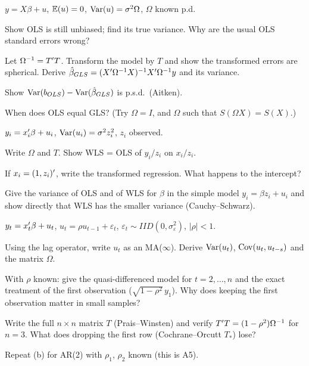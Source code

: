 \documentclass[11pt]{article}
\begin{document}
$y = X\beta + u$, $\mathbb{E}(u) = 0$, $\operatorname{Var}(u) = \sigma^{2}\Omega$, $\Omega$ known p.d.
\begin{flatlist}
  \item[(a)] Show OLS is still unbiased; find its true variance. Why are the usual OLS
        standard errors wrong?
  \item[(b)] Let $\Omega^{-1} = T^{\prime} T$. Transform the model by $T$ and show the transformed
        errors are spherical. Derive $\hat\beta_{GLS} = (X^{\prime}\Omega^{-1}X)^{-1}X^{\prime}\Omega^{-1}y$ and its variance.
  \item[(c)] Show $\operatorname{Var}(b_{OLS}) - \operatorname{Var}(\hat\beta_{GLS})$ is p.s.d.\ (Aitken).
  \item[(d)] When does OLS equal GLS? (Try $\Omega = I$, and $\Omega$ such that $S(\Omega X) = S(X)$.)
\end{flatlist}

$y_{i} = x_{i}^{\prime}\beta + u_{i}$, $\operatorname{Var}(u_{i}) = \sigma^{2}z_{i}^{2}$, $z_{i}$ observed.
\begin{flatlist}
  \item[(a)] Write $\Omega$ and $T$. Show WLS = OLS of $y_{i}/z_{i}$ on $x_{i}/z_{i}$.
  \item[(b)] If $x_{i} = (1, z_{i})^{\prime}$, write the transformed regression. What happens to the intercept?
  \item[(c)] Give the variance of OLS and of WLS for $\beta$ in the simple model $y_{i} = \beta z_{i} + u_{i}$
        and show directly that WLS has the smaller variance (Cauchy--Schwarz).
\end{flatlist}

$y_{t} = x_{t}^{\prime}\beta + u_{t}$, $u_{t} = \rho u_{t-1} + \varepsilon_{t}$,
$\varepsilon_{t} \sim IID(0,\sigma_{\varepsilon}^{2})$, $|\rho| < 1$.
\begin{flatlist}
  \item[(a)] Using the lag operator, write $u_{t}$ as an MA($\infty$). Derive $\operatorname{Var}(u_{t})$,
        $\operatorname{Cov}(u_{t},u_{t-s})$ and the matrix $\Omega$.
  \item[(b)] With $\rho$ known: give the quasi-differenced model for $t = 2,\dots,n$ and the
        exact treatment of the first observation ($\sqrt{1-\rho^{2}}\,y_{1}$). Why does keeping
        the first observation matter in small samples?
  \item[(c)] Write the full $n \times n$ matrix $T$ (Prais--Winsten) and verify
        $T^{\prime} T = (1-\rho^{2})\Omega^{-1}$ for $n = 3$. What does dropping the first row
        (Cochrane--Orcutt $T_{*}$) lose?
  \item[(d)] Repeat (b) for AR(2) with $\rho_{1}$, $\rho_{2}$ known (this is A5).
\end{flatlist}
\end{document}
